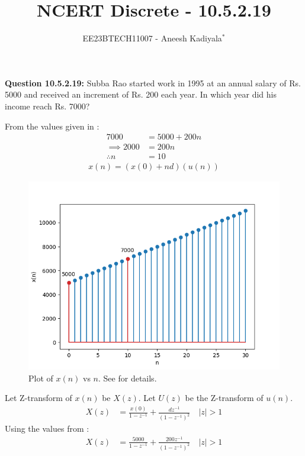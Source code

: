 \documentclass[journal,12pt,twocolumn]{IEEEtran}
\theoremstyle{remark}
\begin{document}

\vspace{3cm}

\title{NCERT Discrete - 10.5.2.19}
\author{EE23BTECH11007 - Aneesh Kadiyala$^{*}$%
}
\maketitle
\newpage
\bigskip

\renewcommand{\thefigure}{\theenumi}
\renewcommand{\thetable}{\theenumi}
\vspace{3cm}
\textbf{Question 10.5.2.19:} Subba Rao started work in 1995 at an annual salary of Rs. 5000 and received an increment of Rs. 200 each year. In which year did his income reach Rs. 7000?

\solution
 
From the values given in :
\begin{align}
7000 &= 5000 + 200n \\
\implies 2000 &= 200n \\
\therefore n &= 10
\end{align}
\begin{align}
x(n) = (x(0) + nd)(u(n))
\end{align}
\begin{figure}[h!]
    \centering
    \includegraphics[width=\columnwidth]{figs/10_5_2_19.png}
    \caption{Plot of $x(n)$ vs $n$. See  for details.}
    \label{fig:1}
\end{figure}
Let Z-transform of $x(n)$ be $X(z)$. Let $U(z)$ be the Z-transform of $u(n)$.
\begin{align}
X(z) &= \frac{x(0)}{1 - z^{-1}} + \frac{dz^{-1}}{(1 - z^{-1})^2} \quad |z| > 1
\end{align}
Using the values from :
\begin{align}
X(z) &= \frac{5000}{1 - z^{-1}} + \frac{200z^{-1}}{(1 - z^{-1})^2} \quad |z| > 1
\end{align}
\end{document}

